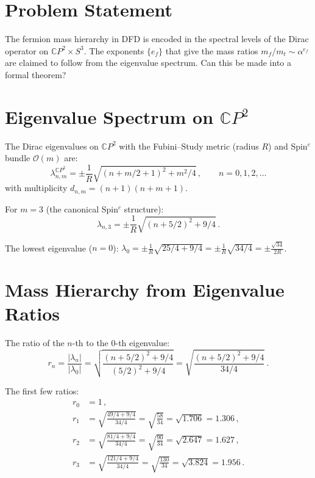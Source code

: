\documentclass[11pt,a4paper]{article}
\newcommand{\CP}{\mathbb{C}P}
\begin{document}
\section{Problem Statement}

The fermion mass hierarchy in DFD is encoded in the spectral levels of the Dirac operator on $\CP^2 \times S^3$. The exponents $\{e_f\}$ that give the mass ratios $m_f/m_t \sim \alpha^{e_f}$ are claimed to follow from the eigenvalue spectrum. Can this be made into a formal theorem?

\section{Eigenvalue Spectrum on $\CP^2$}

The Dirac eigenvalues on $\CP^2$ with the Fubini--Study metric (radius $R$) and Spin$^c$ bundle $\mathcal{O}(m)$ are:
\begin{equation}
\lambda_{n,m}^{\CP^2} = \pm\frac{1}{R}\sqrt{(n+m/2+1)^2 + m^2/4}\,,\qquad n = 0, 1, 2, \ldots
\end{equation}
with multiplicity $d_{n,m} = (n+1)(n+m+1)$.

For $m = 3$ (the canonical Spin$^c$ structure):
\begin{equation}
\lambda_{n,3} = \pm\frac{1}{R}\sqrt{(n+5/2)^2 + 9/4}\,.
\end{equation}

The lowest eigenvalue ($n=0$): $\lambda_0 = \pm\frac{1}{R}\sqrt{25/4 + 9/4} = \pm\frac{1}{R}\sqrt{34/4} = \pm\frac{\sqrt{34}}{2R}$.

\section{Mass Hierarchy from Eigenvalue Ratios}

The ratio of the $n$-th to the 0-th eigenvalue:
\begin{equation}
r_n = \frac{|\lambda_n|}{|\lambda_0|} = \sqrt{\frac{(n+5/2)^2 + 9/4}{(5/2)^2 + 9/4}} = \sqrt{\frac{(n+5/2)^2 + 9/4}{34/4}}\,.
\end{equation}

The first few ratios:
\begin{align}
r_0 &= 1\,, \\
r_1 &= \sqrt{\frac{49/4 + 9/4}{34/4}} = \sqrt{\frac{58}{34}} = \sqrt{1.706} = 1.306\,, \\
r_2 &= \sqrt{\frac{81/4 + 9/4}{34/4}} = \sqrt{\frac{90}{34}} = \sqrt{2.647} = 1.627\,, \\
r_3 &= \sqrt{\frac{121/4 + 9/4}{34/4}} = \sqrt{\frac{130}{34}} = \sqrt{3.824} = 1.956\,.
\end{align}
\end{document}
